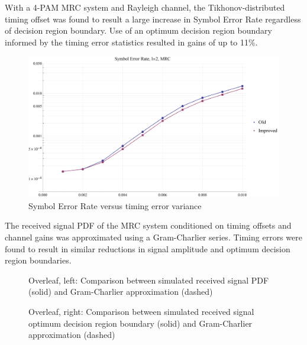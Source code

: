 With a 4-PAM MRC system and Rayleigh channel, the Tikhonov-distributed timing offset was found to result a large increase in Symbol Error Rate regardless of decision region boundary. Use of an optimum decision region boundary informed by the timing error statistics resulted in gains of up to 11\%.

\begin{figure}[htbp]
\centering
\includegraphics[width=\linewidth]{MRC2_SER.png}
\caption{Symbol Error Rate versus timing error variance}
\end{figure}

The received signal PDF of the MRC system conditioned on timing offsets and channel gains was approximated using a Gram-Charlier series. Timing errors were found to result in similar reductions in signal amplitude and optimum decision region boundaries.

\begin{figure}[htbp]
\caption{Overleaf, left: Comparison between simulated received signal PDF (solid) and Gram-Charlier approximation (dashed)}
\end{figure}

{
\setlength{\floatsep}{2pt plus 1.0pt minus 2.0pt}
\setlength{\textfloatsep}{2pt plus 1.0pt minus 2.0pt}
\setlength{\intextsep}{2pt plus 1.0pt minus 2.0pt}
\begin{figure}[htbp]
\caption{Overleaf, right: Comparison between simulated received signal optimum decision region boundary (solid) and Gram-Charlier approximation (dashed)}
\end{figure}
}

